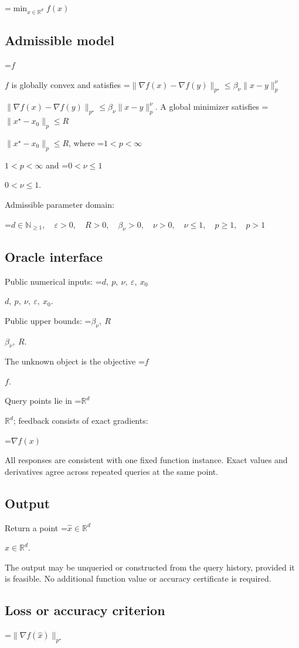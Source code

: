 \documentclass[10pt,a4paper]{article}
\newcommand{\AtlasMath}[1]{\par\begingroup\centering\setbox0=\hbox{$\displaystyle #1$}\ifdim\wd0>1.4\linewidth\typeout{ATLAS WIDE FORMULA: \the\wd0}\fi\ifdim\wd0>\linewidth\resizebox{\linewidth}{!}{\box0}\else\box0\fi\par\endgroup}
\newcommand{\AtlasInlineMath}[1]{\begingroup\setbox0=\hbox{$#1$}\ifdim\wd0>.4\linewidth\endgroup\AtlasMath{#1}\else\endgroup$#1$\fi}
\begin{document}
\AtlasMath{\min_{x\in \mathbb{R}^d}f(x)}


\subsection{Admissible model}
\AtlasInlineMath{f} is globally convex and satisfies \AtlasInlineMath{\|\nabla f(x)-\nabla f(y)\|_{p^\star}\le\beta_\nu\|x-y\|_p^\nu}. A global minimizer satisfies \AtlasInlineMath{\|x^\star-x_0\|_p\le R}, where \AtlasInlineMath{1<p<\infty} and \AtlasInlineMath{0<\nu\le1}.

Admissible parameter domain:


\AtlasMath{d\in\mathbb{N}_{\ge1},\quad \varepsilon>0,\quad R>0,\quad \beta_\nu>0,\quad \nu>0,\quad \nu\le1,\quad p\ge1,\quad p>1}


\subsection{Oracle interface}
Public numerical inputs: \AtlasInlineMath{d,\ p,\ \nu,\ \varepsilon,\ x_0}.

Public upper bounds: \AtlasInlineMath{\beta_\nu,\ R}.

The unknown object is the objective \AtlasInlineMath{f}.

Query points lie in \AtlasInlineMath{\mathbb{R}^d}; feedback consists of exact gradients:


\AtlasMath{\nabla f(x)}


All responses are consistent with one fixed function instance. Exact values and derivatives agree across repeated queries at the same point.

\subsection{Output}
Return a point \AtlasInlineMath{\widehat x\in\mathbb R^d}.

The output may be unqueried or constructed from the query history, provided it is feasible. No additional function value or accuracy certificate is required.

\subsection{Loss or accuracy criterion}

\AtlasMath{\|\nabla f(\widehat{x})\|_{p^\star}}
\end{document}
